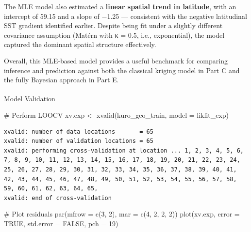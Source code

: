 \documentclass[
  11pt,
]{article}
\makeatletter
\let\oldparagraph\paragraph
\renewcommand{\paragraph}{
    \@ifstar
      \xxxParagraphStar
      \xxxParagraphNoStar
  }
\newcommand{\xxxParagraphStar}[1]{\oldparagraph*{#1}\mbox{}}
\newcommand{\xxxParagraphNoStar}[1]{\oldparagraph{#1}\mbox{}}
\newenvironment{Shaded}{\begin{snugshade}}{\end{snugshade}}
\newcommand{\AttributeTok}[1]{\textcolor[rgb]{0.40,0.45,0.13}{#1}}
\newcommand{\CommentTok}[1]{\textcolor[rgb]{0.37,0.37,0.37}{#1}}
\newcommand{\ConstantTok}[1]{\textcolor[rgb]{0.56,0.35,0.01}{#1}}
\newcommand{\DecValTok}[1]{\textcolor[rgb]{0.68,0.00,0.00}{#1}}
\newcommand{\FunctionTok}[1]{\textcolor[rgb]{0.28,0.35,0.67}{#1}}
\newcommand{\NormalTok}[1]{\textcolor[rgb]{0.00,0.23,0.31}{#1}}
\newcommand{\OtherTok}[1]{\textcolor[rgb]{0.00,0.23,0.31}{#1}}
\makeatother
\begin{document}
The MLE model also estimated a \textbf{linear spatial trend in
latitude}, with an intercept of 59.15 and a slope of −1.25 ---
consistent with the negative latitudinal SST gradient identified
earlier. Despite being fit under a slightly different covariance
assumption (Matérn with κ = 0.5, i.e., exponential), the model captured
the dominant spatial structure effectively.

Overall, this MLE-based model provides a useful benchmark for comparing
inference and prediction against both the classical kriging model in
Part C and the fully Bayesian approach in Part E.

\paragraph{Model Validation}\label{model-validation}

\begin{Shaded}
\begin{Highlighting}[]
\CommentTok{\# Perform LOOCV}
\NormalTok{xv.exp }\OtherTok{\textless{}{-}} \FunctionTok{xvalid}\NormalTok{(kuro\_geo\_train, }\AttributeTok{model =}\NormalTok{ likfit\_exp)}
\end{Highlighting}
\end{Shaded}

\begin{verbatim}
xvalid: number of data locations       = 65
xvalid: number of validation locations = 65
xvalid: performing cross-validation at location ... 1, 2, 3, 4, 5, 6, 7, 8, 9, 10, 11, 12, 13, 14, 15, 16, 17, 18, 19, 20, 21, 22, 23, 24, 25, 26, 27, 28, 29, 30, 31, 32, 33, 34, 35, 36, 37, 38, 39, 40, 41, 42, 43, 44, 45, 46, 47, 48, 49, 50, 51, 52, 53, 54, 55, 56, 57, 58, 59, 60, 61, 62, 63, 64, 65, 
xvalid: end of cross-validation
\end{verbatim}

\begin{Shaded}
\begin{Highlighting}[]
\CommentTok{\# Plot residuals}
\FunctionTok{par}\NormalTok{(}\AttributeTok{mfrow =} \FunctionTok{c}\NormalTok{(}\DecValTok{3}\NormalTok{, }\DecValTok{2}\NormalTok{), }\AttributeTok{mar =} \FunctionTok{c}\NormalTok{(}\DecValTok{4}\NormalTok{, }\DecValTok{2}\NormalTok{, }\DecValTok{2}\NormalTok{, }\DecValTok{2}\NormalTok{))}
\FunctionTok{plot}\NormalTok{(xv.exp, }\AttributeTok{error =} \ConstantTok{TRUE}\NormalTok{, }\AttributeTok{std.error =} \ConstantTok{FALSE}\NormalTok{, }\AttributeTok{pch =} \DecValTok{19}\NormalTok{)}
\end{Highlighting}
\end{Shaded}
\end{document}
